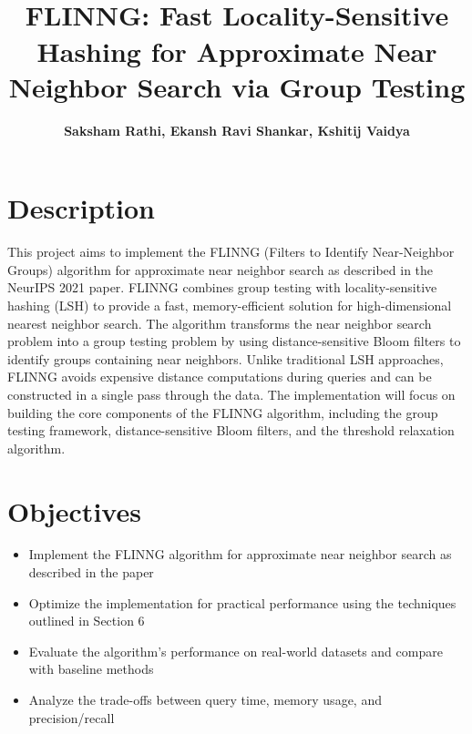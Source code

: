\documentclass[a4paper,12pt]{article}
\title{\cooltitle{CS754 Project Proposal}\\ FLINNG: Fast Locality-Sensitive Hashing for Approximate Near Neighbor Search via Group Testing}
\author{{\bf Saksham Rathi, Ekansh Ravi Shankar, Kshitij Vaidya}}
\date{}
\begin{document}
\maketitle
\section*{Description}
This project aims to implement the FLINNG (Filters to Identify Near-Neighbor Groups) algorithm for approximate near neighbor search as described in the NeurIPS 2021 paper. FLINNG combines group testing with locality-sensitive hashing (LSH) to provide a fast, memory-efficient solution for high-dimensional nearest neighbor search. The algorithm transforms the near neighbor search problem into a group testing problem by using distance-sensitive Bloom filters to identify groups containing near neighbors. Unlike traditional LSH approaches, FLINNG avoids expensive distance computations during queries and can be constructed in a single pass through the data.
The implementation will focus on building the core components of the FLINNG algorithm, including the group testing framework, distance-sensitive Bloom filters, and the threshold relaxation algorithm.

\section*{Objectives}
\begin{itemize}
  \item Implement the FLINNG algorithm for approximate near neighbor search as described in the paper
  \item Optimize the implementation for practical performance using the techniques outlined in Section 6
  \item Evaluate the algorithm's performance on real-world datasets and compare with baseline methods
  \item Analyze the trade-offs between query time, memory usage, and precision/recall
\end{itemize}
\end{document}
